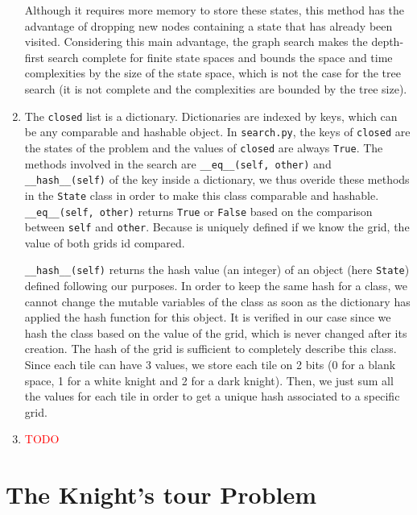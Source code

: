 \documentclass[a4paper,10pt]{article}
\newcommand{\py}[1]{\texttt{#1}}
\begin{document}
\begin{enumerate}
 Although it requires more memory to store these states, this method has the advantage of dropping new nodes containing a state that has already been visited.
 Considering this main advantage, the graph search makes the depth-first search complete for finite state spaces and bounds the space and time complexities by the size of the state space, which is not the case for the tree search (it is not complete and the complexities are bounded by the tree size).
 \item The \py{closed} list is a dictionary.
 Dictionaries are indexed by keys, which can be any comparable and hashable object.
 In \py{search.py}, the keys of \py{closed} are the states of the problem and the values of \py{closed} are always \py{True}.
 The methods involved in the search are \py{__eq__(self, other)} and \py{__hash__(self)} of the key inside a dictionary, we thus overide these methods in the \py{State} class in order to make this class comparable and hashable. \py{__eq__(self, other)} returns \py{True} or \py{False} based on the comparison between \py{self} and \py{other}. Because is uniquely defined if we know the grid, the value of both grids id compared. 
 
 \py{__hash__(self)} returns the hash value (an integer) of an object (here \py{State}) defined following our purposes. In order to keep the same hash for a class, we cannot change the mutable variables of the class as soon as the dictionary has applied the hash function for this object. It is verified in our case since we hash the class based on the value of the grid, which is never changed after its creation. The hash of the grid is sufficient to completely describe this class. Since each tile can have 3 values, we store each tile on 2 bits (0 for a blank space, 1 for a white knight and 2 for a dark knight). Then, we just sum all the values for each tile in order to get a unique hash associated to a specific grid.
 \item \textcolor{red}{TODO}
\end{enumerate}


\section{The Knight’s tour Problem}
\end{document}
